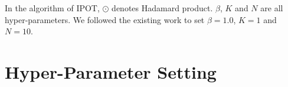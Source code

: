 \documentclass[11pt,a4paper]{article}
\begin{document}
In the algorithm of IPOT, $\odot$ denotes Hadamard product. $\beta$, $K$ and $N$ are all hyper-parameters. We followed the existing work \cite{chen2020got} to set $\beta=1.0$, $K=1$ and $N=10$.


\section{Hyper-Parameter Setting}
\label{app:hyperparam}

\begin{table} [!htp]
\centering
\small
{}
\caption{Hyper-parameter search space of JointGT during pre-training. \textit{choice} indicates that
the listed numbers will be chosen with the same probability.}
\label{tab:pretrainsearch}
\end{table}
\end{document}
